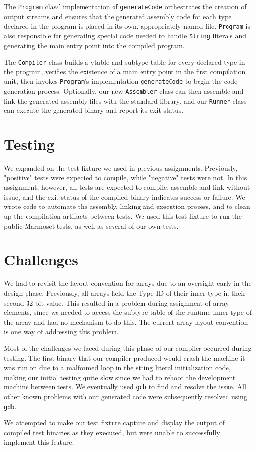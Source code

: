 \documentclass[12pt]{article}
\newcommand{\code}[1]{\texttt{#1}}
\begin{document}
The \code{Program} class' implementation of \code{generateCode} orchestrates the creation of output streams and ensures that the generated assembly code for each type declared in the program is placed in its own, appropriately-named file.  \code{Program} is also responsible for generating special code needed to handle \code{String} literals and generating the main entry point into the compiled program.

The \code{Compiler} class builds a vtable and subtype table for every declared type in the program, verifies the existence of a main entry point in the first compilation unit, then invokes \code{Program}'s implementation \code{generateCode} to begin the code generation process.  Optionally, our new \code{Assembler} class can then assemble and link the generated assembly files with the standard library, and our \code{Runner} class can execute the generated binary and report its exit status.

\section{Testing}

We expanded on the test fixture we used in previous assignments.  Previously, "positive" tests were expected to compile, while "negative" tests were not.  In this assignment, however, all tests are expected to compile, assemble and link without issue, and the exit status of the compiled binary indicates success or failure.  We wrote code to automate the assembly, linking and execution process, and to clean up the compilation artifacts between tests.  We used this test fixture to run the public Marmoset tests, as well as several of our own tests.

\section{Challenges}

We had to revisit the layout convention for arrays due to an oversight early in the design phase.  Previously, all arrays held the Type ID of their inner type in their second 32-bit value.  This resulted in a problem during assignment of array elements, since we needed to access the subtype table of the runtime inner type of the array and had no mechanism to do this.  The current array layout convention is one way of addressing this problem.

Most of the challenges we faced during this phase of our compiler occurred during testing.  The first binary that our compiler produced would crash the machine it was run on due to a malformed loop in the string literal initialization code, making our initial testing quite slow since we had to reboot the development machine between tests.  We eventually used \code{gdb} to find and resolve the issue.  All other known problems with our generated code were subsequently resolved using \code{gdb}.

We attempted to make our test fixture capture and display the output of compiled test binaries as they executed, but were unable to successfully implement this feature.
\end{document}
